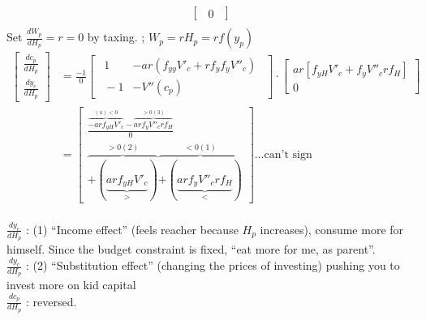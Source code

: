 \documentclass[14pt,notitlepage]{article}
\begin{document}
\begin{itemize}
\begin{align*}
\begin{bmatrix}
                    \ \ 0\ \
                \end{bmatrix} \\
\end{align*}
Set $\frac{dW_p}{dH_p} = r = 0$ by taxing. ; $W_p = r H_p = r f (y_p)$
\begin{align*}
\begin{bmatrix}
\frac{dc_p}{dH_p} \\
\frac{dy_c}{dH_p}
\end{bmatrix} &= \frac{-1}{0} \begin{bmatrix}
                                \ \ 1 & - a r (f_{yy} V'_c + r f_y f_y V''_c)\ \ \\
                                \ \ -1 & -V''(c_p)\ \
                             \end{bmatrix} \cdot \begin{bmatrix}
                                                    a r [f_{yH} V'_c + f_y V''_c r f_H] \\
                                                    0
                                                 \end{bmatrix} \\
              &= \begin{bmatrix}
                    \frac{\overbrace{-a r f_{yH} V'_c}^{(4) < 0} - \overbrace{a r f_y V''_c r f_H}^{> 0 (3)}}{0} \\
                    \overbrace{+ (\underbrace{a r f_{yH} V'_c}_{>})}^{> 0 (2)} \overbrace{+ (\underbrace{a r f_y V''_c r f_H}_{<})}^{< 0 (1)}
                 \end{bmatrix} \ldots \text{can't sign} \\
\end{align*}

$\frac{dy_c}{dH_p}$ \quad : (1) ``Income effect'' (feels reacher because $H_p$ increases), consume more for himself. Since the budget constraint is fixed, ``eat more for me, as parent''. \\
$\frac{dy_c}{dH_p}$ \quad : (2) ``Substitution effect'' (changing the prices of investing) pushing you to invest more on kid capital \\
$\frac{dc_p}{dH_p}$ \quad : reversed.
\end{itemize}
\end{document}
